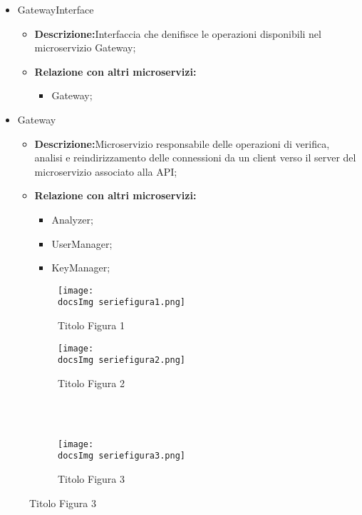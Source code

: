 {\begin{itemize}
\item GatewayInterface
  \begin{itemize}
  \item \textbf{Descrizione:}Interfaccia che denifisce le operazioni disponibili nel microservizio Gateway;
    \item \textbf{Relazione con altri microservizi:}
      \begin{itemize}
      \item Gateway;
      \end{itemize}
  \end{itemize}
\item Gateway
  \begin{itemize}
  \item \textbf{Descrizione:}Microservizio responsabile delle operazioni di verifica, analisi e reindirizzamento delle connessioni da un client verso il server del microservizio associato alla API;
    \item \textbf{Relazione con altri microservizi:}
      \begin{itemize}
      \item Analyzer;
        \item UserManager;
        \item KeyManager;
      \end{itemize}
  \end{itemize}

\end{itemize}

  
  \begin{figure}[ht]
    \begin{subfigure}[b]{0.5\textwidth}
      \texttt{[image: \\docsImg seriefigura1.png]}
      \caption{Titolo Figura 1}
      \label{Titolo Figura 1}
    \end{subfigure}
    \begin{subfigure}[b]{0.5\textwidth}
      \texttt{[image: \\docsImg seriefigura2.png]}
      \caption{Titolo Figura 2}
      \label{Titolo Figura 2}
    \end{subfigure}
    \\
    \\
    \begin{subfigure}[b]{0.5\textwidth}
      \texttt{[image: \\docsImg seriefigura3.png]}
      \caption{Titolo Figura 3}
      \label{Titolo Figura 3}
    \end{subfigure}
  \end{figure}
}

